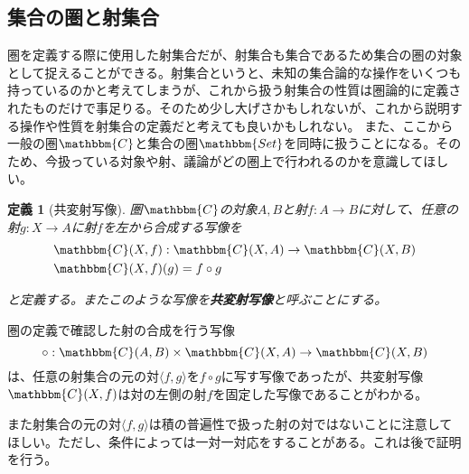 \documentclass[uplatex,dvipdfmx]{jsarticle}
\newcommand{\cat}[1]{\mathbbm{#1}}
\newcommand{\arrow}{\rightarrow}
\newcommand{\tuple}[1]{\langle #1\rangle}
\newcommand{\mor}[3]{#1:#2\arrow #3}
\newcommand{\arset}[3]{\cat{#1}(#2,#3)}
\newtheorem{define}[proof]{定義}
\numberwithin{proof}{subsection}
\begin{document}
  \subsection{集合の圏と射集合}
	圏を定義する際に使用した射集合だが、射集合も集合であるため集合の圏の対象として捉えることができる。射集合というと、未知の集合論的な操作をいくつも持っているのかと考えてしまうが、これから扱う射集合の性質は圏論的に定義されたものだけで事足りる。そのため少し大げさかもしれないが、これから説明する操作や性質を射集合の定義だと考えても良いかもしれない。
  また、ここから一般の圏$\cat{C}$と集合の圏$\cat{Set}$を同時に扱うことになる。そのため、今扱っている対象や射、議論がどの圏上で行われるのかを意識してほしい。

  \begin{define}[共変射写像]
		圏$\cat{C}$の対象$A,B$と射$\mor{f}{A}{B}$に対して、任意の射$\mor{g}{X}{A}$に射$f$を左から合成する写像を
		\begin{align*}
			&\mor{\arset{C}{X}{f}}{\arset{C}{X}{A}}{\arset{C}{X}{B}}\\
			&\arset{C}{X}{f}(g)=f\circ g
		\end{align*}
		\begin{center}
		\end{center}
		と定義する。またこのような写像を\textbf{共変射写像}と呼ぶことにする。
	\end{define}
  
  圏の定義で確認した射の合成を行う写像\[\mor{\circ}{\arset{C}{A}{B}\times\arset{C}{X}{A}}{\arset{C}{X}{B}}\]
  は、任意の射集合の元の対$\tuple{f,g}$を$f\circ g$に写す写像であったが、共変射写像$\arset{C}{X}{f}$は対の左側の射$f$を固定した写像であることがわかる。

  また射集合の元の対$\tuple{f,g}$は積の普遍性で扱った射の対ではないことに注意してほしい。ただし、条件によっては一対一対応をすることがある。これは後で証明を行う。
\end{document}
